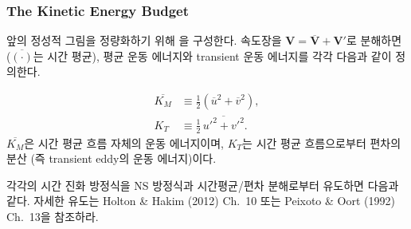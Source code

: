 

\subsubsection{The Kinetic Energy Budget}

앞의 정성적 그림을 정량화하기 위해 을
구성한다.  속도장을 $\mathbf{V} = \overline{\mathbf{V}} + \mathbf{V}'$로
분해하면 ($\overline{(\cdot)}$는 시간 평균),
평균 운동 에너지와 transient 운동 에너지를 각각 다음과 같이 정의한다.

\begin{definition}\label{def:ch06_te_KE}
\begin{align}
  \overline{K_M}
    &\equiv \tfrac{1}{2}\left(\overline{u}^2 + \overline{v}^2\right),
    \label{eq:ch06_te_KM_def}\\
  K_T
    &\equiv \tfrac{1}{2}\,\overline{u'^2 + v'^2}.
    \label{eq:ch06_te_KT_def}
\end{align}
$\overline{K_M}$은 시간 평균 흐름 자체의 운동 에너지이며,
$K_T$는 시간 평균 흐름으로부터 편차의 분산 (즉 transient eddy의
운동 에너지)이다.
\end{definition}


각각의 시간 진화 방정식을 NS 방정식과 시간평균/편차 분해로부터 유도하면
다음과 같다.  자세한 유도는 Holton \& Hakim (2012) Ch.~10 또는
Peixoto \& Oort (1992) Ch.~13을 참조하라.

